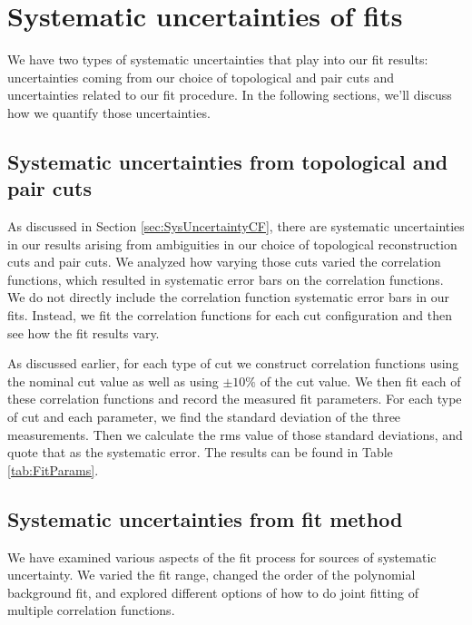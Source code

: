 \section{Systematic uncertainties of fits}
\label{sec:SysErrorsFits}

We have two types of systematic uncertainties that play into our fit results: uncertainties coming from our choice of topological and pair cuts and uncertainties related to our fit procedure.
In the following sections, we'll discuss how we quantify those uncertainties.


\subsection{Systematic uncertainties from topological and pair cuts}
\label{sec:SysErrorsFitsCuts}

As discussed in Section \ref{sec:SysUncertaintyCF}, there are systematic uncertainties in our results arising from ambiguities in our choice of topological reconstruction cuts and pair cuts.
We analyzed how varying those cuts varied the correlation functions, which resulted in systematic error bars on the correlation functions.
We do not directly include the correlation function systematic error bars in our fits.
Instead, we fit the correlation functions for each cut configuration and then see how the fit results vary.

As discussed earlier, for each type of cut we construct correlation functions using the nominal cut value as well as using $\pm10\%$ of the cut value.
We then fit each of these correlation functions and record the measured fit parameters.
For each type of cut and each parameter, we find the standard deviation of the three measurements.
Then we calculate the rms value of those standard deviations, and quote that as the systematic error.
The results can be found in Table \ref{tab:FitParams}.



\subsection{Systematic uncertainties from fit method}
\label{sec:SysErrorsFitsMethod}



We have examined various aspects of the fit process for sources of systematic uncertainty.
We varied the fit range, changed the order of the polynomial background fit, and explored different options of how to do joint fitting of multiple correlation functions.

